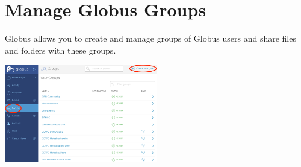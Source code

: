 \chapter{Manage Globus Groups}
Globus allows you to create and manage groups of Globus users and share files and 
folders with these groups.

\begin{center}
\includegraphics[width=0.5\textwidth]{img/groups-1.png}
\end{center}

